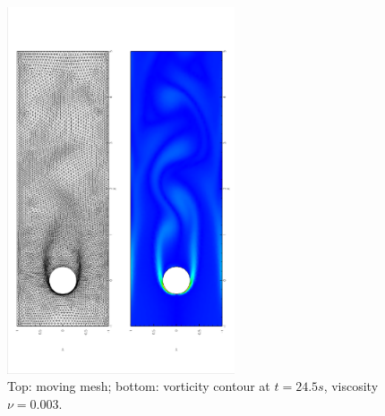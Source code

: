       \begin{figure}[!htbp]
       \begin{center}
         \includegraphics[width = 0.6\textwidth, angle = -90]{picture/first/obstacle_flow_data/mesh_t_24_5s.eps}
       \end{center}
       \caption{\small Top: moving mesh; bottom: vorticity contour at
         $t = 24.5s$, viscosity $\nu = 0.003$.}
       \label{fig::cylinder_mesh_t24_5s}
     \end{figure}

